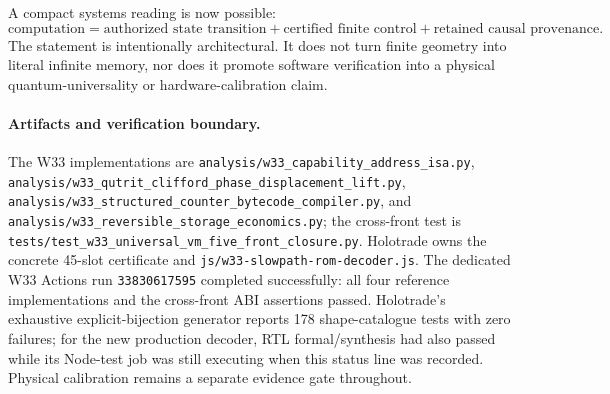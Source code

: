 \begin{center}
\end{center}

\noindent A compact systems reading is now possible:
\[
\boxed{\text{computation}=\text{authorized state transition}
+\text{certified finite control}+\text{retained causal provenance}.}
\]
The statement is intentionally architectural.  It does not turn finite geometry into
literal infinite memory, nor does it promote software verification into a physical
quantum-universality or hardware-calibration claim.

\paragraph{Artifacts and verification boundary.}
The W33 implementations are
\texttt{analysis/w33\_capability\_address\_isa.py},
\texttt{analysis/w33\_qutrit\_clifford\_phase\_displacement\_lift.py},
\texttt{analysis/w33\_structured\_counter\_bytecode\_compiler.py}, and
\texttt{analysis/w33\_reversible\_storage\_economics.py}; the cross-front test is
\texttt{tests/test\_w33\_universal\_vm\_five\_front\_closure.py}.
Holotrade owns the concrete 45-slot certificate and
\texttt{js/w33-slowpath-rom-decoder.js}.
The dedicated W33 Actions run \texttt{33830617595} completed successfully: all four
reference implementations and the cross-front ABI assertions passed.  Holotrade's
exhaustive explicit-bijection generator reports 178 shape-catalogue tests with zero
failures; for the new production decoder, RTL formal/synthesis had also passed while its
Node-test job was still executing when this status line was recorded.  Physical
calibration remains a separate evidence gate throughout.
